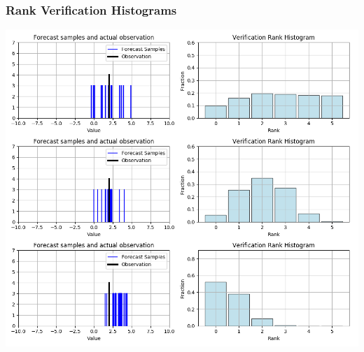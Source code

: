 \documentclass[18pt]{beamer}
\begin{document}
\begin{frame}
  \frametitle{Rank Verification Histograms}
  \begin{center}
    \includegraphics[scale=0.32]{images/verification_histogram}
  \end{center}
\end{frame}
\end{document}

